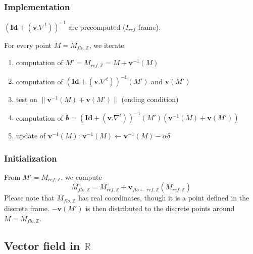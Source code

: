 
\subsubsection{Implementation}

$\left(
\mathbf{Id} + (\mathbf{v}.\nabla^t)
\right)^{-1}$ are precomputed ($I_{ref}$ frame).

For every point $M = M_{flo,\mathbb{Z}}$, we iterate:
\begin{enumerate}
\itemsep -0.5ex
\item computation of 
$M' = M_{ref,\mathbb{Z}} = M + \mathbf{v}^{-1}(M)$
\item computation of 
$\left(
\mathbf{Id} + (\mathbf{v}.\nabla^t)
\right)^{-1} (M')$ and $\mathbf{v}( M' )$
\item test on 
$\| \mathbf{v}^{-1}(M) + \mathbf{v}( M' ) \|$ (ending condition)
\item computation of 
$\mathbf{\delta} = 
\left(
\mathbf{Id} + (\mathbf{v}.\nabla^t)
\right)^{-1} (M')
\left( \mathbf{v}^{-1}(M) + \mathbf{v}( M' ) \right)$
\item update of $\mathbf{v}^{-1}(M)$:
$\mathbf{v}^{-1}(M) \leftarrow \mathbf{v}^{-1}(M) - \alpha \delta$
\end{enumerate}


\subsubsection{Initialization}

From $M' = M_{ref,\mathbb{Z}}$, we compute 
\begin{displaymath}
M_{flo,\mathbb{Z}} = 
M_{ref,\mathbb{Z}} 
+ \mathbf{v}_{flo \leftarrow ref, \mathbb{Z}}(M_{ref,\mathbb{Z}} )
\end{displaymath}
Please note that $M_{flo,\mathbb{Z}}$ has real coordinates, though it is a point defined in the discrete frame. $-\mathbf{v}( M' )$ is then distributed to the discrete points around  $M=M_{flo,\mathbb{Z}}$.

\subsection{Vector field in $\mathbb{R}$}

